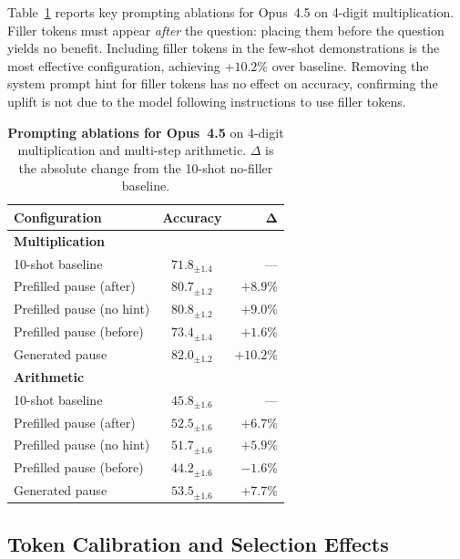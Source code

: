 \documentclass{article}
\begin{document}
Table~\ref{tab:prompting_results} reports key prompting ablations for Opus~4.5 on 4-digit multiplication. Filler tokens must appear \emph{after} the question: placing them before the question yields no benefit. Including filler tokens in the few-shot demonstrations is the most effective configuration, achieving $+10.2\%$ over baseline. Removing the system prompt hint for filler tokens has no effect on accuracy, confirming the uplift is not due to the model following instructions to use filler tokens.

\begin{table}[h]
\centering
\caption{\textbf{Prompting ablations for Opus~4.5} on 4-digit multiplication and multi-step arithmetic. $\Delta$ is the absolute change from the 10-shot no-filler baseline.}
\label{tab:prompting_results}
\small
{}
\begin{tabular}{@{}lcr@{}}
\toprule
\textbf{Configuration} & \textbf{Accuracy} & $\boldsymbol{\Delta}$ \\
\midrule
\multicolumn{3}{l}{\textbf{Multiplication}} \\
\midrule
10-shot baseline          & $71.8_{\pm 1.4}$ & ---     \\
Prefilled pause (after)   & $80.7_{\pm 1.2}$ & $+8.9\%$ \\
Prefilled pause (no hint) & $80.8_{\pm 1.2}$ & $+9.0\%$ \\
Prefilled pause (before)  & $73.4_{\pm 1.4}$ & $+1.6\%$ \\
Generated pause           & $82.0_{\pm 1.2}$ & $+10.2\%$ \\
\midrule
\multicolumn{3}{l}{\textbf{Arithmetic}} \\
\midrule
10-shot baseline          & $45.8_{\pm 1.6}$ & ---     \\
Prefilled pause (after)   & $52.5_{\pm 1.6}$ & $+6.7\%$ \\
Prefilled pause (no hint) & $51.7_{\pm 1.6}$ & $+5.9\%$ \\
Prefilled pause (before)  & $44.2_{\pm 1.6}$ & $-1.6\%$ \\
Generated pause           & $53.5_{\pm 1.6}$ & $+7.7\%$ \\
\bottomrule
\end{tabular}
\end{table}

\subsection{Token Calibration and Selection Effects}
\label{app:calibration}
\end{document}
